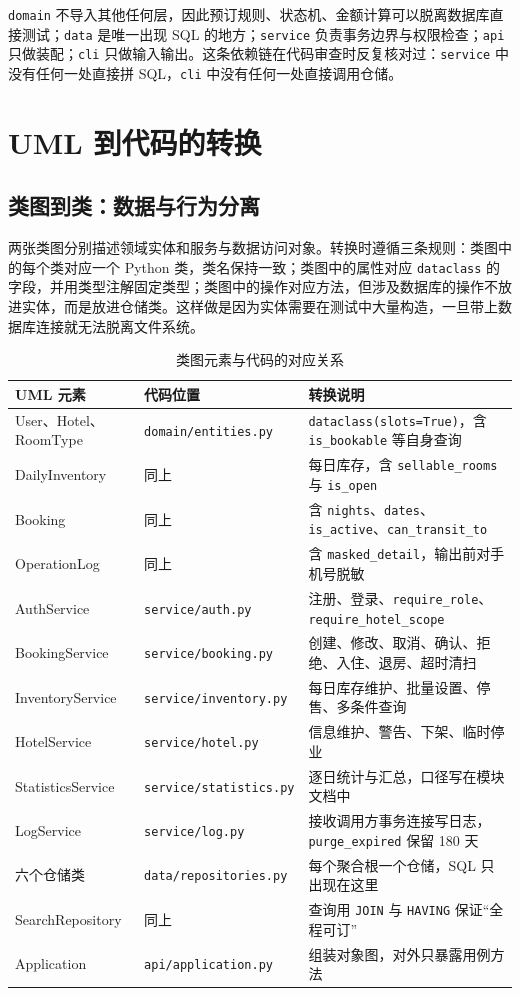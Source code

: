 \documentclass[11pt,a4paper,fontset=none]{ctexart}
\begin{document}
\texttt{domain} 不导入其他任何层，因此预订规则、状态机、金额计算可以脱离数据库直接测试；\texttt{data} 是唯一出现 SQL 的地方；\texttt{service} 负责事务边界与权限检查；\texttt{api} 只做装配；\texttt{cli} 只做输入输出。这条依赖链在代码审查时反复核对过：\texttt{service} 中没有任何一处直接拼 SQL，\texttt{cli} 中没有任何一处直接调用仓储。

\section{UML 到代码的转换}

\subsection{类图到类：数据与行为分离}

两张类图分别描述领域实体和服务与数据访问对象。转换时遵循三条规则：类图中的每个类对应一个 Python 类，类名保持一致；类图中的属性对应 \texttt{dataclass} 的字段，并用类型注解固定类型；类图中的操作对应方法，但涉及数据库的操作不放进实体，而是放进仓储类。这样做是因为实体需要在测试中大量构造，一旦带上数据库连接就无法脱离文件系统。

\begin{table}[H]
\centering
\caption{类图元素与代码的对应关系}
\small
\begin{tabularx}{\textwidth}{p{3.5cm}p{4.8cm}p{6.2cm}}
\toprule
UML 元素 & 代码位置 & 转换说明 \\
\midrule
User、Hotel、RoomType & \texttt{domain/entities.py} & \texttt{dataclass(slots=True)}，含 \texttt{is\_bookable} 等自身查询 \\
DailyInventory & 同上 & 每日库存，含 \texttt{sellable\_rooms} 与 \texttt{is\_open} \\
Booking & 同上 & 含 \texttt{nights}、\texttt{dates}、\texttt{is\_active}、\texttt{can\_transit\_to} \\
OperationLog & 同上 & 含 \texttt{masked\_detail}，输出前对手机号脱敏 \\
AuthService & \texttt{service/auth.py} & 注册、登录、\texttt{require\_role}、\texttt{require\_hotel\_scope} \\
BookingService & \texttt{service/booking.py} & 创建、修改、取消、确认、拒绝、入住、退房、超时清扫 \\
InventoryService & \texttt{service/inventory.py} & 每日库存维护、批量设置、停售、多条件查询 \\
HotelService & \texttt{service/hotel.py} & 信息维护、警告、下架、临时停业 \\
StatisticsService & \texttt{service/statistics.py} & 逐日统计与汇总，口径写在模块文档中 \\
LogService & \texttt{service/log.py} & 接收调用方事务连接写日志，\texttt{purge\_expired} 保留 180 天 \\
六个仓储类 & \texttt{data/repositories.py} & 每个聚合根一个仓储，SQL 只出现在这里 \\
SearchRepository & 同上 & 查询用 \texttt{JOIN} 与 \texttt{HAVING} 保证“全程可订” \\
Application & \texttt{api/application.py} & 组装对象图，对外只暴露用例方法 \\
\bottomrule
\end{tabularx}
\end{table}
\end{document}
